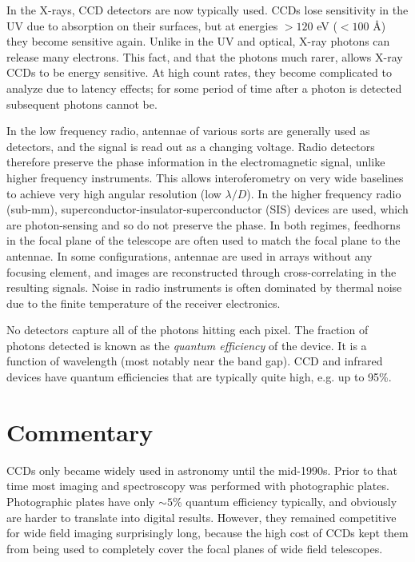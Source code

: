 In the X-rays, CCD detectors are now typically used. CCDs lose
sensitivity in the UV due to absorption on their surfaces, but at
energies $> 120$ eV ($<100$ \AA) they become sensitive again. Unlike
in the UV and optical, X-ray photons can release many electrons. This
fact, and that the photons much rarer, allows X-ray CCDs to be energy
sensitive. At high count rates, they become complicated to analyze due
to latency effects; for some period of time after a photon is detected
subsequent photons cannot be.

In the low frequency radio, antennae of various sorts are generally
used as detectors, and the signal is read out as a changing
voltage. Radio detectors therefore preserve the phase information in
the electromagnetic signal, unlike higher frequency instruments. This
allows interoferometry on very wide baselines to achieve very high
angular resolution (low $\lambda/D$). In the higher frequency radio
(sub-mm), superconductor-insulator-superconductor (SIS) devices are
used, which are photon-sensing and so do not preserve the phase.  In
both regimes, feedhorns in the focal plane of the telescope are often
used to match the focal plane to the antennae. In some configurations,
antennae are used in arrays without any focusing element, and images
are reconstructed through cross-correlating in the resulting
signals. Noise in radio instruments is often dominated by thermal
noise due to the finite temperature of the receiver electronics.

No detectors capture all of the photons hitting each pixel. The
fraction of photons detected is known as the {\it quantum efficiency}
of the device. It is a function of wavelength (most notably near the
band gap). CCD and infrared devices have quantum efficiencies that are
typically quite high, e.g. up to 95\%.

\section{Commentary}

CCDs only became widely used in astronomy until the mid-1990s. Prior
to that time most imaging and spectroscopy was performed with
photographic plates. Photographic plates have only $\sim 5$\% quantum
efficiency typically, and obviously are harder to translate into
digital results. However, they remained competitive for wide field
imaging surprisingly long, because the high cost of CCDs kept them
from being used to completely cover the focal planes of wide field
telescopes.

